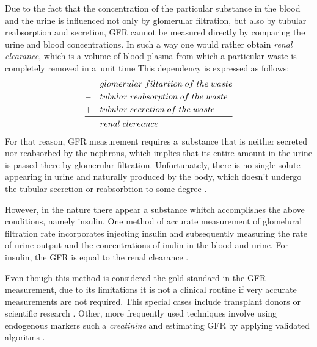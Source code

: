 Due to the fact that the concentration of the particular substance in the blood and the urine is influenced not only by glomerular filtration, but also by tubular reabsorption and secretion, GFR cannot be measured directly by comparing the urine and blood concentrations. In such a way one would rather obtain \textit{renal clearance}, which is a volume of blood plasma from which a particular waste is completely removed in a~unit time \cite{saladin} This dependency is expressed as follows:
\begin{equation}
\begin{aligned}
&glomerular\;filtartion\;of\;the\;waste\\
-\quad&tubular\;reabsorption\;of\;the\;waste\\
+\quad&tubular\;secretion\;of\;the\;waste\\
\midrule
&renal\;clereance
\end{aligned}	
\label{eq:gfr_formula}
\end{equation}
For that reason, GFR measurement requires a~substance that is neither secreted nor reabsorbed by the nephrons, which implies that its entire amount in the urine is passed there by glomerular filtration. Unfortunately, there is no single solute appearing in urine and naturally produced by the body, which doesn't undergo the tubular secretion or reabsorbtion to some degree \cite{delanaye2012measuring}. 

However, in the nature there appear a substance whitch accomplishes the above conditions, namely insulin. One method of accurate measurement of glomelural filtration rate incorporates injecting insulin and subsequently measuring the rate of urine output and the concentrations of inulin in the blood and urine. For insulin, the GFR is equal to the renal clearance \cite{saladin, delanaye2012measuring}.


Even though this method is considered the gold standard in the GFR measurement, due to its limitations it is not a clinical routine if very accurate measurements are not required. This special cases include transplant donors or scientific research \cite{traynor2006measure}. 
Other, more frequently used techniques involve using endogenous markers such a \textit{creatinine} and estimating GFR by applying validated algoritms \cite{delanaye2012measuring}. 
 